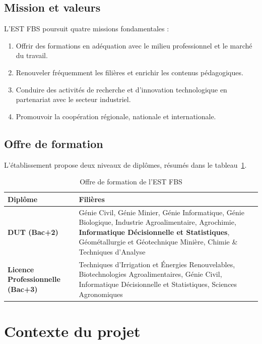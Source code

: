 \documentclass[12pt, a4paper, twoside]{report}
\begin{document}
\subsection{Mission et valeurs}

L'EST FBS poursuit quatre missions fondamentales :

\begin{enumerate}
  \item Offrir des formations en adéquation avec le milieu professionnel et le marché du travail.
  \item Renouveler fréquemment les filières et enrichir les contenus pédagogiques.
  \item Conduire des activités de recherche et d'innovation technologique en partenariat avec le secteur industriel.
  \item Promouvoir la coopération régionale, nationale et internationale.
\end{enumerate}

\subsection{Offre de formation}

L'établissement propose deux niveaux de diplômes, résumés dans le tableau~\ref{tab:formations}.

\begin{table}[H]
\centering
\caption{Offre de formation de l'EST FBS}
\label{tab:formations}
\begin{tabularx}{\textwidth}{>{\bfseries}l X}
\toprule
\rowcolor{primary!10}
\textbf{Diplôme} & \textbf{Filières} \\
\midrule
DUT (Bac+2)
  & Génie Civil, Génie Minier, Génie Informatique, Génie Biologique,
    Industrie Agroalimentaire, Agrochimie,
    \textbf{Informatique Décisionnelle et Statistiques},
    Géométallurgie et Géotechnique Minière, Chimie \& Techniques d'Analyse \\
\midrule
Licence Professionnelle (Bac+3)
  & Techniques d'Irrigation et Énergies Renouvelables, Biotechnologies
    Agroalimentaires, Génie Civil,
    Informatique Décisionnelle et Statistiques, Sciences Agronomiques \\
\bottomrule
\end{tabularx}
\end{table}

\section{Contexte du projet}
\end{document}
